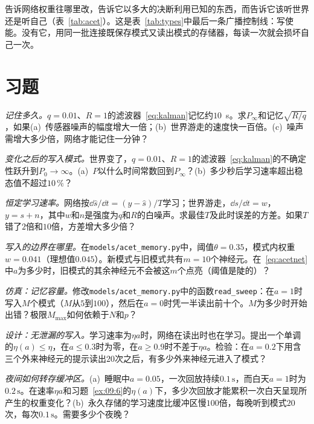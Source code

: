告诉网络权重往哪里改，告诉它以多大的决断利用已知的东西，而告诉它该听世界还是听自己（表~\ref{tab:acet}）。这是表~\ref{tab:types}中最后一条广播控制线：写使能。没有它，用同一批连接既保存模式又读出模式的存储器，每读一次就会损坏自己一次。

\section{习题}

\begin{exercise}[\lvlA]
\label{ex:09:1}
\emph{记住多久。}$q=0.01$、$R=1$的滤波器~\eqref{eq:kalman}记忆约$10$~s。求$P_\infty$和记忆$\sqrt{R/q}$，如果(a)~传感器噪声的幅度增大一倍；(b)~世界游走的速度快一百倍。(c)~噪声需增大多少倍，网络才能记住一分钟？
\end{exercise}

\begin{exercise}[\lvlB]
\label{ex:09:2}
\emph{变化之后的写入模式。}世界变了，$q=0.01$、$R=1$的滤波器~\eqref{eq:kalman}的不确定性跃升到$P_0\to\infty$。(a)~$P$以什么时间常数回到$P_\infty$？(b)~多少秒后学习速率超出稳态值不超过$10\,\%$？
\end{exercise}

\begin{exercise}[\lvlB]
\label{ex:09:3}
\emph{恒定学习速率。}网络按$\dd\hat s/\dd t=(y-\hat s)/T$学习；世界游走，$\dd s/\dd t=w$，$y=s+n$，其中$w$和$n$是强度为$q$和$R$的白噪声。求最佳$T$及此时误差的方差。如果$T$错了$2$倍和$10$倍，方差增大多少倍？
\end{exercise}

\begin{exercise}[\lvlB]
\label{ex:09:4}
\emph{写入的边界在哪里。}在\texttt{models/\allowbreak acet\_memory.py}中，阈值$\theta=0.35$，模式内权重$w=0.041$（理想值$0.045$）。新模式与旧模式共有$m=10$个神经元。在~\eqref{eq:acetnet}中$a$为多少时，旧模式的其余神经元不会被这$m$个点亮（阈值是陡的）？
\end{exercise}

\begin{exercise}[\lvlB]
\label{ex:09:5}
\emph{仿真：记忆容量。}修改\texttt{models/\allowbreak acet\_memory.py}中的函数\texttt{read\_sweep}：在$a=1$时写入$M$个模式（$M$从$5$到$100$），然后在$a=0$时凭一半读出前十个。$M$为多少时开始出错？极限$M_{\max}$如何依赖于$N$和$p$？
\end{exercise}

\begin{exercise}[\lvlB]
\label{ex:09:6}
\emph{设计：无泄漏的写入。}学习速率为$\eta a$时，网络在读出时也在学习。提出一个单调的$\eta(a)\le\eta$，在$a\le0.3$时为零，在$a\ge0.9$时不差于$\eta a$。检验：在$a=0.2$下用含三个外来神经元的提示读出$20$次之后，有多少外来神经元进入了模式？
\end{exercise}

\begin{exercise}[\lvlC]
\label{ex:09:7}
\emph{夜间如何转存缓冲区。}(a)~睡眠中$a=0.05$，一次回放持续$0.1\,\text{s}$，而白天$a=1$时为$0.2\,\text{s}$。在速率$\eta a$和习题~\ref{ex:09:6}的$\eta(a)$下，多少次回放才能累积一次白天呈现所产生的权重变化？(b)~永久存储的学习速度比缓冲区慢$100$倍，每晚听到模式$20$次，每次$0.1\,\text{s}$。需要多少个夜晚？
\end{exercise}
